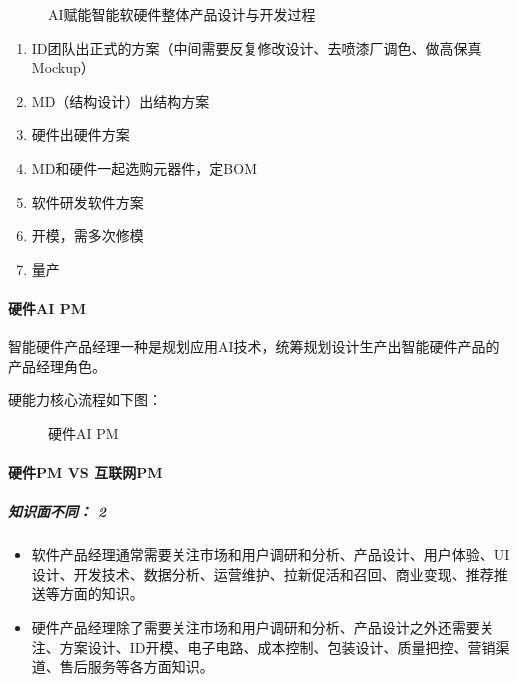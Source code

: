 \documentclass[letterpaper,10pt,english]{sphinxmanual}
\begin{document}
\begin{figure}[H]
\centering
\capstart

\noindent{}
\caption{AI赋能智能软硬件整体产品设计与开发过程}\label{\detokenize{chapter_project/AI_hardware:id33}}\end{figure}
\begin{enumerate}
%
\item {} 
ID团队出正式的方案（中间需要反复修改设计、去喷漆厂调色、做高保真Mockup）

\item {} 
MD（结构设计）出结构方案

\item {} 
硬件出硬件方案

\item {} 
MD和硬件一起选购元器件，定BOM

\item {} 
软件研发软件方案

\item {} 
开模，需多次修模

\item {} 
量产

\end{enumerate}


\paragraph{硬件AI PM}
\label{\detokenize{chapter_project/AI_hardware:ai-pm}}
智能硬件产品经理一种是规划应用AI技术，统筹规划设计生产出智能硬件产品的产品经理角色。

硬能力核心流程如下图：

\begin{figure}[H]
\centering
\capstart

\noindent{}
\caption{硬件AI PM}\label{\detokenize{chapter_project/AI_hardware:id34}}\end{figure}


\paragraph{硬件PM VS 互联网PM}
\label{\detokenize{chapter_project/AI_hardware:pm-vs-pm}}

\subparagraph{知识面不同： 2\sphinxfootnotemark[788]}
\label{\detokenize{chapter_project/AI_hardware:id3}}%
\begin{footnotetext}[788]\sphinxAtStartFootnote
{}
%
\end{footnotetext}\ignorespaces \begin{itemize}
\item {} 
软件产品经理通常需要关注市场和用户调研和分析、产品设计、用户体验、UI设计、开发技术、数据分析、运营维护、拉新促活和召回、商业变现、推荐推送等方面的知识。

\item {} 
硬件产品经理除了需要关注市场和用户调研和分析、产品设计之外还需要关注、方案设计、ID开模、电子电路、成本控制、包装设计、质量把控、营销渠道、售后服务等各方面知识。

\end{itemize}
\end{document}
